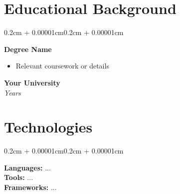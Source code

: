 \documentclass[10pt, letterpaper]{article}
\newenvironment{highlights}{
    \begin{itemize}[
        topsep=0.15cm,
        parsep=0.15cm,
        partopsep=0pt,
        itemsep=0.1cm,
        leftmargin=0.4cm + 10pt
    ]
}{
    \end{itemize}
}
\newenvironment{onecolentry}{
    \begin{adjustwidth}{0.2cm + 0.00001cm}{0.2cm + 0.00001cm}
}{
    \end{adjustwidth}
}
\newenvironment{twocolentry}[2][]{
    \onecolentry
    \def\secondColumn{#2}
    \setcolumnwidth{\fill, 4.5cm}
    \begin{paracol}{2}
}{
    \switchcolumn \raggedleft \secondColumn
    \end{paracol}
    \endonecolentry
}
\begin{document}
\section{Educational Background}
\begin{twocolentry}{\textbf{Your University} \\ \textit{Years}}
    \textbf{Degree Name}
    \begin{highlights}
        \item Relevant coursework or details
    \end{highlights}
\end{twocolentry}

\section{Technologies}
\begin{onecolentry}
    \textbf{Languages:} ... \\
    \textbf{Tools:} ... \\
    \textbf{Frameworks:} ...
\end{onecolentry}
\end{document}
